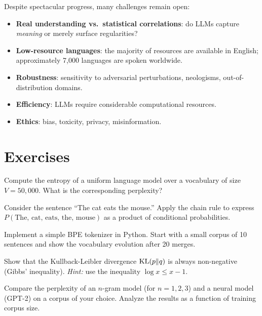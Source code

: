Despite spectacular progress, many challenges remain open:

\begin{itemize}
    \item \textbf{Real understanding vs.\ statistical correlations}: do LLMs
          capture \emph{meaning} or merely surface regularities?
    \item \textbf{Low-resource languages}: the majority of resources are
          available in English; approximately 7,000 languages are spoken
          worldwide.
    \item \textbf{Robustness}: sensitivity to adversarial perturbations,
          neologisms, out-of-distribution domains.
    \item \textbf{Efficiency}: LLMs require considerable computational
          resources.
    \item \textbf{Ethics}: bias, toxicity, privacy, misinformation.
\end{itemize}

\section{Exercises}
\label{sec:intro:exercises}

\begin{exercise}[$\star$]
Compute the entropy of a uniform language model over a vocabulary of size
$V = 50{,}000$. What is the corresponding perplexity?
\end{exercise}

\begin{exercise}[$\star$]
Consider the sentence ``The cat eats the mouse.'' Apply the chain rule to
express $P(\text{The, cat, eats, the, mouse})$ as a product of conditional
probabilities.
\end{exercise}

\begin{exercise}[$\star\star$]
Implement a simple BPE tokenizer in Python. Start with a small corpus of 10
sentences and show the vocabulary evolution after 20 merges.
\end{exercise}

\begin{exercise}[$\star\star$]
Show that the Kullback-Leibler divergence $\mathrm{KL}(p \| q)$ is always non-negative
(Gibbs' inequality). \emph{Hint:} use the inequality $\log x \leq x - 1$.
\end{exercise}

\begin{exercise}[$\star\star\star$]
Compare the perplexity of an $n$-gram model (for $n = 1, 2, 3$) and a neural
model (GPT-2) on a corpus of your choice. Analyze the results as a function of
training corpus size.
\end{exercise}
